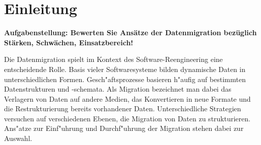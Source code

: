 \section{Einleitung}


\huge
\textbf{Aufgabenstellung: Bewerten Sie Ansätze der Datenmigration bezüglich Stärken, Schwächen, Einsatzbereich!} 
\normalsize
\lb

Die Datenmigration spielt im Kontext des Software-Reengineering eine entscheidende Rolle. Basis vieler Softwaresysteme bilden dynamische Daten in unterschiedlichen Formen. Gesch"aftsprozesse basieren h"aufig auf bestimmten Datenstrukturen und -schemata. Als Migration bezeichnet man dabei das Verlagern von Daten auf andere Medien, das Konvertieren in neue Formate und die Restrukturierung bereits vorhandener Daten.
\lb
Unterschiedliche Strategien versuchen auf verschiedenen Ebenen, die Migration von Daten zu strukturieren. Ans"atze zur Einf"uhrung und Durchf"uhrung der Migration stehen dabei zur Auswahl.

